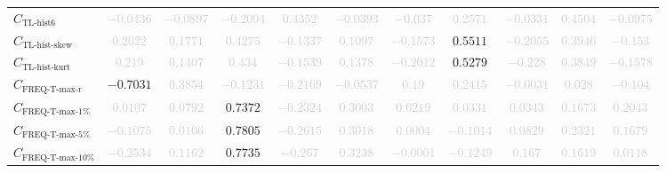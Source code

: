 \documentclass{standalone}
\newcommand{\tlhistsixname}{\text{TL-hist6}}
\newcommand{\tlhistsix}{C_{\tlhistsixname}}
\newcommand{\tlskewhistname}{\text{TL-hist-skew}}
\newcommand{\tlskewhist}{C_{\tlskewhistname}}
\newcommand{\tlkurthistname}{\text{TL-hist-kurt}}
\newcommand{\tlkurthist}{C_{\tlkurthistname}}
\newcommand{\freqmaxrname}{\text{FREQ-T-max-r}}
\newcommand{\freqmaxr}{C_{\freqmaxrname}}
\newcommand{\freqmaxonename}{\text{FREQ-T-max-1\%}}
\newcommand{\freqmaxone}{C_{\freqmaxonename}}
\newcommand{\freqmaxfivename}{\text{FREQ-T-max-5\%}}
\newcommand{\freqmaxfive}{C_{\freqmaxfivename}}
\newcommand{\freqmaxtenname}{\text{FREQ-T-max-10\%}}
\newcommand{\freqmaxten}{C_{\freqmaxtenname}}
\begin{document}
\begin{tabular}{lcccccccccc}
$\tlhistsix$ & \textcolor{lightgray}{$-0.0436$} & \textcolor{lightgray}{$-0.0897$} & \textcolor{lightgray}{$-0.2094$} & \textcolor{lightgray}{$0.4352$} & \textcolor{lightgray}{$-0.0393$} & \textcolor{lightgray}{$-0.037$} & \textcolor{lightgray}{$0.2571$} & \textcolor{lightgray}{$-0.0331$} & \textcolor{lightgray}{$0.4504$} & \textcolor{lightgray}{$-0.0975$} \\ 
$\tlskewhist$ & \textcolor{lightgray}{$0.2022$} & \textcolor{lightgray}{$0.1771$} & \textcolor{lightgray}{$0.4275$} & \textcolor{lightgray}{$-0.1337$} & \textcolor{lightgray}{$0.1097$} & \textcolor{lightgray}{$-0.1573$} & $0.5511$ & \textcolor{lightgray}{$-0.2055$} & \textcolor{lightgray}{$0.3946$} & \textcolor{lightgray}{$-0.153$} \\ 
$\tlkurthist$ & \textcolor{lightgray}{$0.219$} & \textcolor{lightgray}{$0.1407$} & \textcolor{lightgray}{$0.434$} & \textcolor{lightgray}{$-0.1539$} & \textcolor{lightgray}{$0.1378$} & \textcolor{lightgray}{$-0.2012$} & $0.5279$ & \textcolor{lightgray}{$-0.228$} & \textcolor{lightgray}{$0.3849$} & \textcolor{lightgray}{$-0.1578$} \\ 
$\freqmaxr$ & $-0.7031$ & \textcolor{lightgray}{$0.3854$} & \textcolor{lightgray}{$-0.1231$} & \textcolor{lightgray}{$-0.2169$} & \textcolor{lightgray}{$-0.0537$} & \textcolor{lightgray}{$0.19$} & \textcolor{lightgray}{$0.2415$} & \textcolor{lightgray}{$-0.0031$} & \textcolor{lightgray}{$0.028$} & \textcolor{lightgray}{$-0.104$} \\ 
$\freqmaxone$ & \textcolor{lightgray}{$0.0107$} & \textcolor{lightgray}{$0.0792$} & $0.7372$ & \textcolor{lightgray}{$-0.2324$} & \textcolor{lightgray}{$0.3003$} & \textcolor{lightgray}{$0.0219$} & \textcolor{lightgray}{$0.0331$} & \textcolor{lightgray}{$0.0343$} & \textcolor{lightgray}{$0.1673$} & \textcolor{lightgray}{$0.2043$} \\ 
$\freqmaxfive$ & \textcolor{lightgray}{$-0.1075$} & \textcolor{lightgray}{$0.0106$} & $0.7805$ & \textcolor{lightgray}{$-0.2615$} & \textcolor{lightgray}{$0.3018$} & \textcolor{lightgray}{$0.0004$} & \textcolor{lightgray}{$-0.1014$} & \textcolor{lightgray}{$0.0829$} & \textcolor{lightgray}{$0.2321$} & \textcolor{lightgray}{$0.1679$} \\ 
$\freqmaxten$ & \textcolor{lightgray}{$-0.2534$} & \textcolor{lightgray}{$0.1162$} & $0.7735$ & \textcolor{lightgray}{$-0.267$} & \textcolor{lightgray}{$0.3238$} & \textcolor{lightgray}{$-0.0001$} & \textcolor{lightgray}{$-0.1249$} & \textcolor{lightgray}{$0.167$} & \textcolor{lightgray}{$0.1619$} & \textcolor{lightgray}{$0.0118$} \\ 

\end{tabular}
\end{document}
